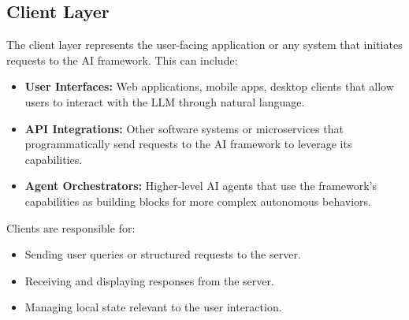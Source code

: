 \documentclass[10pt, a4paper]{article}
\begin{document}
\subsection{Client Layer}
The client layer represents the user-facing application or any system that initiates requests to the AI framework. This can include:
\begin{itemize}
    \item \textbf{User Interfaces:} Web applications, mobile apps, desktop clients that allow users to interact with the LLM through natural language.
    \item \textbf{API Integrations:} Other software systems or microservices that programmatically send requests to the AI framework to leverage its capabilities.
    \item \textbf{Agent Orchestrators:} Higher-level AI agents that use the framework's capabilities as building blocks for more complex autonomous behaviors.
\end{itemize}
Clients are responsible for:
\begin{itemize}
    \item Sending user queries or structured requests to the server.
    \item Receiving and displaying responses from the server.
    \item Managing local state relevant to the user interaction.
\end{itemize}
\end{document}
